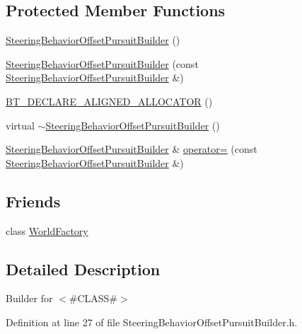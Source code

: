 \subsection*{Protected Member Functions}
\begin{DoxyCompactItemize}
\item 
\mbox{\hyperlink{classnjli_1_1_steering_behavior_offset_pursuit_builder_a6b7dd170b5569e4f8b4be14cba4506dc}{Steering\+Behavior\+Offset\+Pursuit\+Builder}} ()
\item 
\mbox{\hyperlink{classnjli_1_1_steering_behavior_offset_pursuit_builder_a84051fdecb12b3f2cde2862a0ce45ab9}{Steering\+Behavior\+Offset\+Pursuit\+Builder}} (const \mbox{\hyperlink{classnjli_1_1_steering_behavior_offset_pursuit_builder}{Steering\+Behavior\+Offset\+Pursuit\+Builder}} \&)
\item 
\mbox{\hyperlink{classnjli_1_1_steering_behavior_offset_pursuit_builder_abb4bc8254cf3cdf48d341da959ffdeac}{B\+T\+\_\+\+D\+E\+C\+L\+A\+R\+E\+\_\+\+A\+L\+I\+G\+N\+E\+D\+\_\+\+A\+L\+L\+O\+C\+A\+T\+OR}} ()
\item 
virtual \mbox{\hyperlink{classnjli_1_1_steering_behavior_offset_pursuit_builder_aebb501537022ad2d45040542e5653694}{$\sim$\+Steering\+Behavior\+Offset\+Pursuit\+Builder}} ()
\item 
\mbox{\hyperlink{classnjli_1_1_steering_behavior_offset_pursuit_builder}{Steering\+Behavior\+Offset\+Pursuit\+Builder}} \& \mbox{\hyperlink{classnjli_1_1_steering_behavior_offset_pursuit_builder_a1d878fffed3543bd244225ed8f8f40ae}{operator=}} (const \mbox{\hyperlink{classnjli_1_1_steering_behavior_offset_pursuit_builder}{Steering\+Behavior\+Offset\+Pursuit\+Builder}} \&)
\end{DoxyCompactItemize}
\subsection*{Friends}
\begin{DoxyCompactItemize}
\item 
class \mbox{\hyperlink{classnjli_1_1_steering_behavior_offset_pursuit_builder_acb96ebb09abe8f2a37a915a842babfac}{World\+Factory}}
\end{DoxyCompactItemize}


\subsection{Detailed Description}
Builder for $<$\#\+C\+L\+A\+SS\#$>$ 

Definition at line 27 of file Steering\+Behavior\+Offset\+Pursuit\+Builder.\+h.



